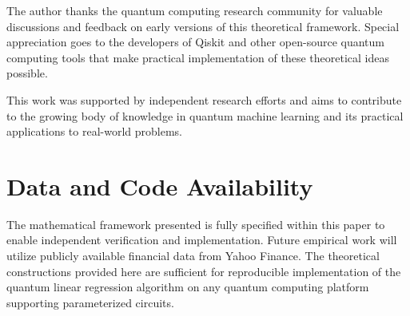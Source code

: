 \documentclass[11pt]{article}
\begin{document}
The author thanks the quantum computing research community for valuable discussions and feedback on early versions of this theoretical framework. Special appreciation goes to the developers of Qiskit and other open-source quantum computing tools that make practical implementation of these theoretical ideas possible.

This work was supported by independent research efforts and aims to contribute to the growing body of knowledge in quantum machine learning and its practical applications to real-world problems.

\section*{Data and Code Availability}

The mathematical framework presented is fully specified within this paper to enable independent verification and implementation. Future empirical work will utilize publicly available financial data from Yahoo Finance. The theoretical constructions provided here are sufficient for reproducible implementation of the quantum linear regression algorithm on any quantum computing platform supporting parameterized circuits.
\end{document}
